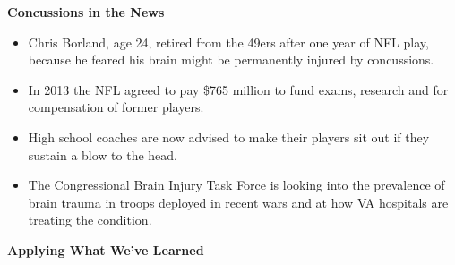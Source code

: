 \def\theTopic{Effects of Concussion }
\def\dayNum{26 }

\begin{center}
{\bf {\large Concussions in the News}}\\
\end{center}

\begin{itemize}
\item 
Chris Borland, age 24,  retired from the 49ers after one year of
NFL play, because he feared his brain might be permanently injured by
concussions.
\item In 2013 the NFL agreed to pay \$765 million to fund exams,
  research and for compensation of former players.
\item High school coaches are now advised to make their
  players sit out if they sustain a blow to the head. 
\item The Congressional Brain Injury Task Force is looking into 
  the prevalence of brain trauma in troops deployed in recent wars and
  at how VA hospitals are treating the condition.
\end{itemize}

\begin{center}
  {\large\bf Applying What We've Learned}
\end{center}


